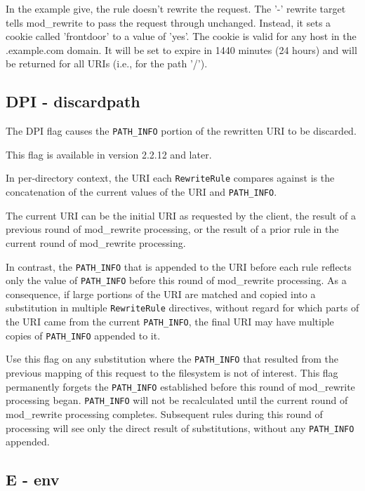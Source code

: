 In the example give, the rule doesn't rewrite the request. The '-' rewrite target tells mod\_rewrite to pass the request through unchanged. Instead, it sets a cookie called 'frontdoor' to a value of 'yes'. The cookie is valid for any host in the .example.com domain. It will be set to expire in 1440 minutes (24 hours) and will be returned for all URIs (i.e., for the path '/').

\subsection{DPI - discardpath}
\label{dpiflag}

The DPI flag causes the \verb~PATH_INFO~ portion of the rewritten URI to be discarded.

This flag is available in version 2.2.12 and later.

In per-directory context, the URI each \verb~RewriteRule~ compares against is the concatenation of the current values of the URI and \verb~PATH_INFO~.

The current URI can be the initial URI as requested by the client, the result of a previous round of mod\_rewrite processing, or the result of a prior rule in the current round of mod\_rewrite processing.

In contrast, the \verb~PATH_INFO~ that is appended to the URI before each rule reflects only the value of \verb~PATH_INFO~ before this round of mod\_rewrite processing. As a consequence, if large portions of the URI are matched and copied into a substitution in multiple \verb~RewriteRule~ directives, without regard for which parts of the URI came from the current \verb~PATH_INFO~, the final URI may have multiple copies of \verb~PATH_INFO~ appended to it.

Use this flag on any substitution where the \verb~PATH_INFO~ that resulted from the previous mapping of this request to the filesystem is not of interest. This flag permanently forgets the \verb~PATH_INFO~ established before this round of mod\_rewrite processing began. \verb~PATH_INFO~ will not be recalculated until the current round of mod\_rewrite processing completes. Subsequent rules during this round of processing will see only the direct result of substitutions, without any \verb~PATH_INFO~ appended.

\subsection{E - env}
\label{eflag}

